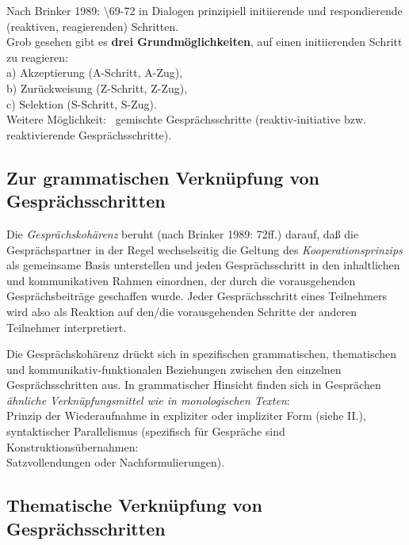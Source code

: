 \documentclass[
  letterpaper,
]{scrbook}
\begin{document}
Nach Brinker 1989: \textbackslash69-72 in Dialogen prinzipiell
initiierende und respondierende (reaktiven, reagierenden) Schritten.\\

Grob gesehen gibt es \textbf{drei Grundmöglichkeiten}, auf einen
initiierenden Schritt zu reagieren:\\
a) Akzeptierung (A-Schritt, A-Zug),\\
b) Zurückweisung (Z-Schritt, Z-Zug),\\
c) Selektion (S-Schritt, S-Zug).\\

Weitere Möglichkeit: ~gemischte Gesprächsschritte (reaktiv-initiative
bzw. reaktivierende Gesprächsschritte).\\

\hypertarget{zur-grammatischen-verknuxfcpfung-von-gespruxe4chsschritten}{%
\subsection{Zur grammatischen Verknüpfung von
Gesprächsschritten}\label{zur-grammatischen-verknuxfcpfung-von-gespruxe4chsschritten}}

Die \emph{Gesprächskohärenz} beruht (nach Brinker 1989: 72ff.) darauf,
daß die Gesprächspartner in der Regel wechselseitig die Geltung des
\emph{Kooperationsprinzips} als gemeinsame Basis unterstellen und jeden
Gesprächsschritt in den inhaltlichen und kommunikativen Rahmen
einordnen, der durch die vorausgehenden Gesprächsbeiträge geschaffen
wurde. Jeder Gesprächsschritt eines Teilnehmers wird also als Reaktion
auf den/die vorausgehenden Schritte der anderen Teilnehmer
interpretiert.

Die Gesprächskohärenz drückt sich in spezifischen grammatischen,
thematischen und kommunikativ-funktionalen Beziehungen zwischen den
einzelnen Gesprächsschritten aus. In grammatischer Hinsicht finden sich
in Gesprächen \emph{ähnliche Verknüpfungsmittel wie in monologischen
Texten}:\\
Prinzip der Wiederaufnahme in expliziter oder impliziter Form (siehe
II.),\\
syntaktischer Parallelismus (spezifisch für Gespräche sind
Konstruktionsübernahmen:\\
Satzvollendungen oder Nachformulierungen).\\

\hypertarget{thematische-verknuxfcpfung-von-gespruxe4chsschritten}{%
\subsection{Thematische Verknüpfung von
Gesprächsschritten}\label{thematische-verknuxfcpfung-von-gespruxe4chsschritten}}
\end{document}
